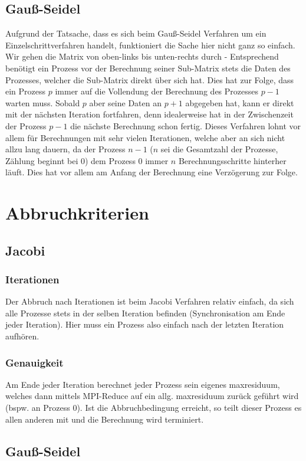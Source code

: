 \documentclass[11pt]{article} %
\begin{document}
\subsection{Gauß-Seidel}

Aufgrund der Tatsache, dass es sich beim Gauß-Seidel Verfahren um ein Einzelschrittverfahren handelt, funktioniert die Sache hier nicht ganz so einfach. Wir gehen die Matrix von oben-links bis unten-rechts durch - Entsprechend benötigt ein Prozess vor der Berechnung seiner Sub-Matrix stets die Daten des Prozesses, welcher die Sub-Matrix direkt über sich hat. Dies hat zur Folge, dass ein Prozess $p$ immer auf die Vollendung der Berechnung des Prozesses $p-1$ warten muss. Sobald $p$ aber seine Daten an $p+1$ abgegeben hat, kann er direkt mit der nächsten Iteration fortfahren, denn idealerweise hat in der Zwischenzeit der Prozess $p-1$ die nächste Berechnung schon fertig. Dieses Verfahren lohnt vor allem für Berechnungen mit sehr vielen Iterationen, welche aber an sich nicht allzu lang dauern, da der Prozess $n-1$ ($n$ sei die Gesamtzahl der Prozesse, Zählung beginnt bei 0) dem Prozess $0$ immer $n$ Berechnungsschritte hinterher läuft. Dies hat vor allem am Anfang der Berechnung eine Verzögerung zur Folge.

\section{Abbruchkriterien}
\subsection{Jacobi}
\subsubsection{Iterationen}
Der Abbruch nach Iterationen ist beim Jacobi Verfahren relativ einfach, da sich alle Prozesse stets in der selben Iteration befinden (Synchronisation am Ende jeder Iteration). Hier muss ein Prozess also einfach nach der letzten Iteration aufhören.
\subsubsection{Genauigkeit}
Am Ende jeder Iteration berechnet jeder Prozess sein eigenes maxresiduum, welches dann mittels MPI-Reduce auf ein allg. maxresiduum zurück geführt wird (bspw. an Prozess 0). Ist die Abbruchbedingung erreicht, so teilt dieser Prozess es allen anderen mit und die Berechnung wird terminiert.
\subsection{Gauß-Seidel}
\end{document}
